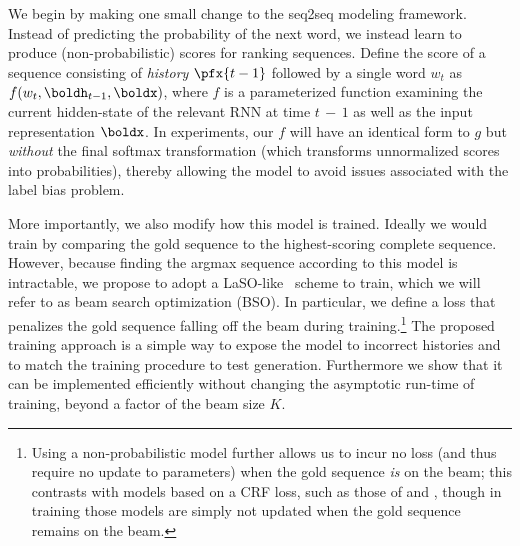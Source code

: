 We begin by making one small change to the seq2seq modeling
framework. Instead of predicting the probability of the next
word, we instead learn to produce (non-probabilistic) scores
for ranking sequences. Define the score of a sequence consisting of 
\textit{history} $\pfx{t-1}$ followed by a single word $w_{t}$ as $f(w_{t}, \boldh_{t-1}, \boldx)$,
where $f$ is a parameterized function examining the current
hidden-state of the relevant RNN at time $t\,{-}\,1$ as well as the input
representation $\boldx$. In experiments, our $f$ will have an identical 
form to $g$ but \textit{without} the final softmax transformation (which transforms unnormalized scores into probabilities),  thereby allowing the model to avoid issues associated with the label bias
problem.




More importantly, we also modify how this model is
trained. Ideally we would train by comparing the gold sequence to the
highest-scoring complete sequence. However, because finding the
argmax sequence according to this model is intractable, we
propose to adopt a LaSO-like~\cite{daume05learning} scheme to train, which we will refer to as beam search optimization (BSO). In particular, we define a loss that
penalizes the gold sequence falling off the beam during
training.\footnote{Using a non-probabilistic model further allows us
  to incur no loss (and thus require no update to parameters) when the
  gold sequence \textit{is} on the beam; this contrasts with models
  based on a CRF loss, such as those of  and
  , though in training those models are simply not
  updated when the gold sequence remains on the beam.} The proposed
training approach is a simple way to expose the model to incorrect
histories and to match the training procedure to test
generation. Furthermore we show that it can be implemented efficiently
without changing the asymptotic run-time of training, beyond a factor
of the beam size $K$.

